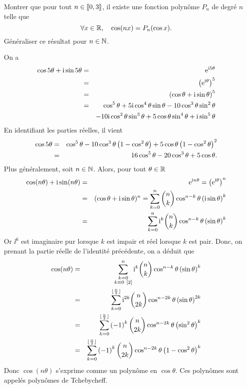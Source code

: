 \documentclass{magnoliaold}
\begin{document}
\begin{exoUnique}
\exo
  \begin{questions}
  \question Montrer que pour tout $n\in\left\llbracket 0,3\right\rrbracket$, il existe une fonction
    polynôme $P_n$ de degré $n$ telle que
    \[\forall x\in\mathbb{R},\quad \cos(nx)=P_n(\cos x).\]
  \question Généraliser ce résultat pour $n\in\mathbb{N}$.
  \end{questions}
  \begin{sol}
  On a
    \begin{eqnarray*}
    \cos 5\theta+{\rm i}\sin 5\theta 
    &=& {\rm e}^{{\rm i} 5\theta}\\
    &=& \left({\rm e}^{{\rm i}\theta}\right)^5\\
    &=& \left(\cos\theta+{\rm i}\sin\theta\right)^5\\
    &=& \cos^5\theta+5{\rm i}\cos^4\theta\sin\theta-10\cos^3\theta\sin^2\theta\\
    & & -10{\rm i}\cos^2\theta\sin^3\theta+5\cos\theta\sin^4\theta+{\rm i}\sin^5\theta
    \end{eqnarray*}
    En identifiant les parties réelles, il vient
    \begin{eqnarray*}
    \cos 5\theta
    &=& \cos^5\theta-10\cos^3\theta\left(1-\cos^2\theta\right)
        +5\cos\theta\left(1-\cos^2\theta\right)^2\\
    &=& 16\cos^5\theta-20\cos^3\theta+5\cos\theta.
    \end{eqnarray*}
  Plus généralement, soit $n\in\mathbb{N}$. Alors, pour tout $\theta\in\mathbb{R}$
  \begin{eqnarray*}
  \cos(n\theta)+{\rm i}\sin(n\theta)
  &=& {\rm e}^{{\rm i} n\theta} = \left({\rm e}^{{\rm i}\theta}\right)^n\\
  &=& (\cos\theta+{\rm i}\sin\theta)^n = \sum_{k=0}^n \binom{n}{k}\cos^{n-k}\theta\left({\rm i}\sin\theta\right)^k\\
  &=& \sum_{k=0}^n {\rm i}^k\binom{n}{k}\cos^{n-k}\theta\left(\sin\theta\right)^k
  \end{eqnarray*} 
  Or $\ii^k$ est imaginaire pur lorsque $k$ est impair et réel lorsque $k$ est pair. Donc, on prenant la partie réelle de l'identité précédente, on a déduit que
  \begin{eqnarray*}
  \cos(n\theta)
  &=& \sum_{\substack{k=0\\ k\equiv 0\ [2]}}^n {\rm i}^k\binom{n}{k}\cos^{n-k}\theta\left(\sin\theta\right)^k\\
  &=& \sum_{k=0}^{\lfloor\frac{n}{2}\rfloor} {\rm i}^{2k} \binom{n}{2k}\cos^{n-2k}\theta\left(\sin\theta\right)^{2k}\\
  &=& \sum_{k=0}^{\lfloor\frac{n}{2}\rfloor} \left(-1\right)^k \binom{n}{2k}\cos^{n-2k}\theta\left(\sin^2\theta\right)^{k}\\
  &=& \sum_{k=0}^{\lfloor\frac{n}{2}\rfloor} \left(-1\right)^k \binom{n}{2k}\cos^{n-2k}\theta\left(1-\cos^2\theta\right)^{k}
  \end{eqnarray*} 
  Donc $\cos(n\theta)$ s'exprime comme un polynôme en $\cos\theta$. Ces polynômes sont appelés polynômes de Tchebycheff.
  \end{sol}
\end{exoUnique}
\end{document}
